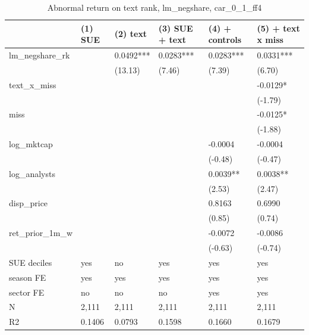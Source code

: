 \begin{table}
\caption{Abnormal return on text rank, lm_negshare, car_0_1_ff4}
\label{tab:t8_regressions__lm_negshare__car_0_1_ff4__validation}
\begin{tabular}{llllll}
\toprule
 & (1) SUE & (2) text & (3) SUE + text & (4) + controls & (5) + text x miss \\
\midrule
lm\_negshare\_rk &  & 0.0492*** & 0.0283*** & 0.0283*** & 0.0331*** \\
 &  & (13.13) & (7.46) & (7.39) & (6.70) \\
text\_x\_miss &  &  &  &  & -0.0129* \\
 &  &  &  &  & (-1.79) \\
miss &  &  &  &  & -0.0125* \\
 &  &  &  &  & (-1.88) \\
log\_mktcap &  &  &  & -0.0004 & -0.0004 \\
 &  &  &  & (-0.48) & (-0.47) \\
log\_analysts &  &  &  & 0.0039** & 0.0038** \\
 &  &  &  & (2.53) & (2.47) \\
disp\_price &  &  &  & 0.8163 & 0.6990 \\
 &  &  &  & (0.85) & (0.74) \\
ret\_prior\_1m\_w &  &  &  & -0.0072 & -0.0086 \\
 &  &  &  & (-0.63) & (-0.74) \\
SUE deciles & yes & no & yes & yes & yes \\
season FE & yes & yes & yes & yes & yes \\
sector FE & no & no & no & yes & yes \\
N & 2,111 & 2,111 & 2,111 & 2,111 & 2,111 \\
R2 & 0.1406 & 0.0793 & 0.1598 & 0.1660 & 0.1679 \\
\bottomrule
\end{tabular}
\end{table}

